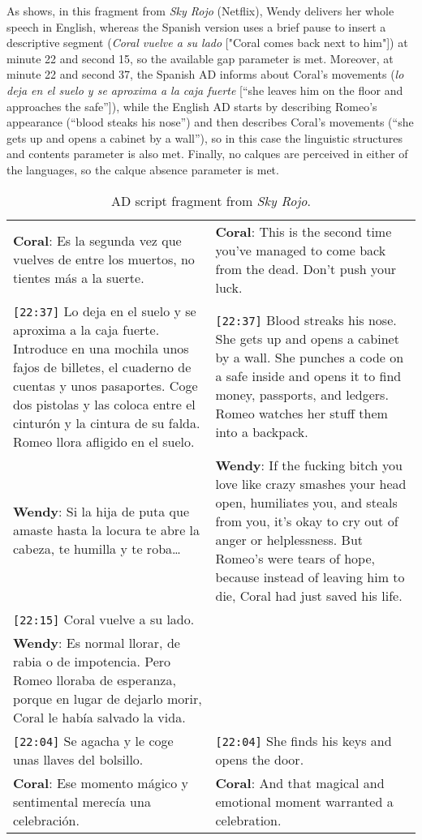 \documentclass[english]{textolivre}
\begin{document}
As  shows, in this fragment from \textit{Sky Rojo} (Netflix), Wendy delivers her whole speech in English, whereas the Spanish version uses a brief pause to insert a descriptive segment (\textit{Coral vuelve a su lado} ["Coral comes back next to him"]) at minute 22 and second 15, so the available gap parameter is met. Moreover, at minute 22 and second 37, the Spanish AD informs about Coral’s movements (\textit{lo deja en el suelo y se aproxima a la caja fuerte} [“she leaves him on the floor and approaches the safe”]), while the English AD starts by describing Romeo’s appearance (“blood steaks his nose”) and then describes Coral’s movements (“she gets up and opens a cabinet by a wall”), so in this case the linguistic structures and contents parameter is also met. Finally, no calques are perceived in either of the languages, so the calque absence parameter is met.

\begin{table}[h!]
\centering
\begin{threeparttable}
\caption{AD script fragment from \textit{Sky Rojo}.}
\label{tbl4}
\begin{tabular}{p{7cm} p{7cm}}
\toprule
\textbf{Coral}: Es la segunda vez que vuelves de entre los muertos, no tientes más a la suerte. &
\textbf{Coral}: This is the second time you’ve managed to come back from the dead. Don’t push your luck.  \\ 
\texttt{[22:37]} Lo deja en el suelo y se aproxima a la caja fuerte. Introduce en una mochila unos fajos de billetes, el cuaderno de cuentas y unos pasaportes. Coge dos pistolas y las coloca entre el cinturón y la cintura de su falda. Romeo llora afligido en el suelo. &
\texttt{[22:37]} Blood streaks his nose. She gets up and opens a cabinet by a wall. She punches a code on a safe inside and opens it to find money, passports, and ledgers. Romeo watches her stuff them into a backpack.    \\ 
\textbf{Wendy}: Si la hija de puta que amaste hasta la locura te abre la cabeza, te humilla y te roba… &
\textbf{Wendy}: If the fucking bitch you love like crazy smashes your head open, humiliates you, and steals from you, it’s okay to cry out of anger or helplessness. But Romeo’s were tears of hope, because instead of leaving him to die, Coral had just saved his life.     \\ 
\texttt{[22:15]} Coral vuelve a su lado. & \\
\textbf{Wendy}: Es normal llorar, de rabia o de impotencia. Pero Romeo lloraba de esperanza, porque en lugar de dejarlo morir, Coral le había salvado la vida. & \\
\texttt{[22:04]} Se agacha y le coge unas llaves del bolsillo. &
\texttt{[22:04]} She finds his keys and opens the door. \\
\textbf{Coral}: Ese momento mágico y sentimental merecía una celebración. &
\textbf{Coral}: And that magical and emotional moment warranted a celebration. \\
\bottomrule
\end{tabular}
\end{threeparttable}
\end{table}
\end{document}
